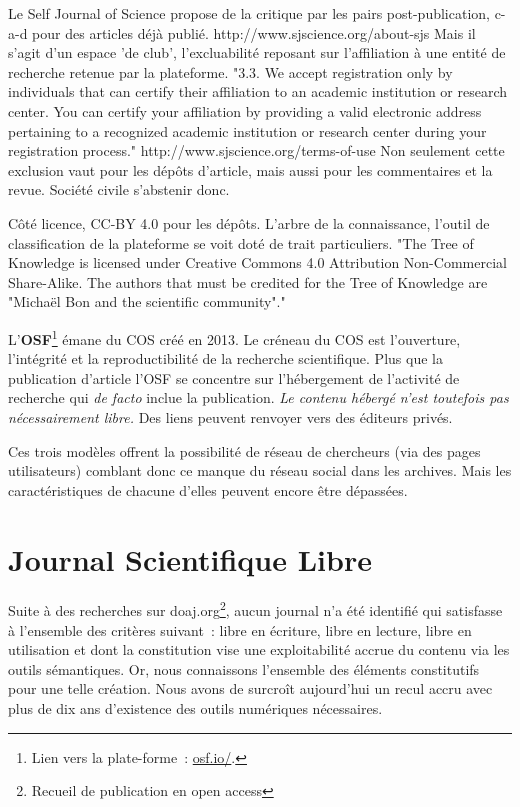 Le Self Journal of Science propose de la critique par les pairs post-publication, c-a-d pour des articles déjà publié.
http://www.sjscience.org/about-sjs
Mais il s'agit d'un espace 'de club', l'excluabilité reposant sur l'affiliation à une entité de recherche retenue par la plateforme.
"3.3. We accept registration only by individuals that can certify their affiliation to an academic institution or research center. You can certify your affiliation by providing a valid electronic address pertaining to a recognized academic institution or research center during your registration process."
http://www.sjscience.org/terms-of-use
Non seulement cette exclusion vaut pour les dépôts d'article, mais aussi pour les commentaires et la revue.
Société civile s'abstenir donc.

Côté licence, CC-BY 4.0 pour les dépôts.
L'arbre de la connaissance, l'outil de classification de la plateforme se voit doté de trait particuliers.
"The Tree of Knowledge is licensed under Creative Commons 4.0 Attribution Non-Commercial Share-Alike. The authors that must be credited for the Tree of Knowledge are "Michaël Bon and the scientific community"."

L'\textbf{\gls{OSF}}\footnote{Lien vers la plate-forme~: \href{https://osf.io/}{osf.io/}.} émane du \gls{COS} créé en 2013.
Le créneau du \gls{COS} est l'ouverture, l'intégrité et la reproductibilité de la recherche scientifique.
Plus que la publication d'article l'\gls{OSF} se concentre sur l'hébergement de l'activité de recherche qui \textit{de facto} inclue la publication.
\emph{Le contenu hébergé n'est toutefois pas nécessairement libre.}
Des liens peuvent renvoyer vers des éditeurs privés.

Ces trois modèles offrent la possibilité de réseau de chercheurs (via des pages utilisateurs) comblant donc ce manque du réseau social dans les archives.
Mais les caractéristiques de chacune d'elles peuvent encore être dépassées. 

\section{Journal Scientifique Libre}
\label{sec:JSL}

Suite à des recherches sur doaj.org\footnote{Recueil de publication en open access}, aucun journal n'a été identifié qui satisfasse à l'ensemble des critères suivant~: libre en écriture, libre en lecture, libre en utilisation et dont la constitution vise une exploitabilité accrue du contenu via les outils sémantiques.
Or, nous connaissons l'ensemble des éléments constitutifs pour une telle création.
Nous avons de surcroît aujourd'hui un recul accru avec plus de dix ans d’existence des outils numériques nécessaires.

